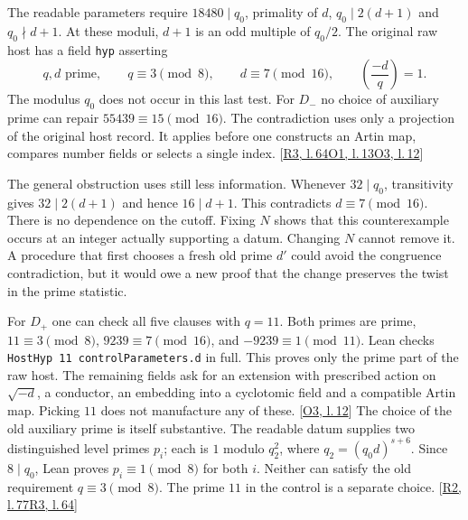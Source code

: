 \documentclass[12pt,letterpaper]{article}
\newcommand{\id}[1]{{\small\nolinkurl{#1}}}
\begin{document}
The readable parameters require $18480\mid q_0$, primality of $d$, $q_0\mid 2(d+1)$ and $q_0\nmid d+1$. At these moduli, $d+1$ is an odd multiple of $q_0/2$. The original raw host has a field \id{hyp} asserting
\[
 q,d\text{ prime},\qquad q\equiv3\pmod8,\qquad
 d\equiv7\pmod{16},\qquad \left(\frac{-d}{q}\right)=1 .
\]
The modulus $q_0$ does not occur in this last test. For $D_-$ no choice of auxiliary prime can repair $55439\equiv15\pmod{16}$. The contradiction uses only a projection of the original host record. It applies before one constructs an Artin map, compares number fields or selects a single index. {\footnotesize\sffamily\color{mute}[\href{https://github.com/leanprover-community/riemann-hypothesis/blob/e063a923620ee7787b4a1270421478645bf66bdb/src/New/Reduction/Data/FieldsAndPlaces.lean#L64}{R3, l.\,64}\enspace \href{https://github.com/nousentllc/riemann-hypothesis/blob/40e56bab026552e089d7afcfeff08d2defb9c005/src/Formalism/FrobeniusOrbits/Statement.lean#L13}{O1, l.\,13}\enspace \href{https://github.com/nousentllc/riemann-hypothesis/blob/40e56bab026552e089d7afcfeff08d2defb9c005/src/Formalism/SharpRestriction/RamificationFrobenius/TotientGaloisClasses/ConjEMemHostFIff.lean#L12}{O3, l.\,12}]}

The general obstruction uses still less information. Whenever $32\mid q_0$, transitivity gives $32\mid 2(d+1)$ and hence $16\mid d+1$. This contradicts $d\equiv7\pmod{16}$. There is no dependence on the cutoff. Fixing $N$ shows that this counterexample occurs at an integer actually supporting a datum. Changing $N$ cannot remove it. A procedure that first chooses a fresh old prime $d'$ could avoid the congruence contradiction, but it would owe a new proof that the change preserves the twist in the prime statistic.

For $D_+$ one can check all five clauses with $q=11$. Both primes are prime, $11\equiv3\pmod8$, $9239\equiv7\pmod{16}$, and $-9239\equiv1\pmod{11}$. Lean checks \id{HostHyp 11 controlParameters.d} in full. This proves only the prime part of the raw host. The remaining fields ask for an extension with prescribed action on $\sqrt{-d}$, a conductor, an embedding into a cyclotomic field and a compatible Artin map. Picking $11$ does not manufacture any of these. {\footnotesize\sffamily\color{mute}[\href{https://github.com/nousentllc/riemann-hypothesis/blob/40e56bab026552e089d7afcfeff08d2defb9c005/src/Formalism/SharpRestriction/RamificationFrobenius/TotientGaloisClasses/ConjEMemHostFIff.lean#L12}{O3, l.\,12}]}
The choice of the old auxiliary prime is itself substantive. The readable datum supplies two distinguished level primes $p_i$; each is $1$ modulo $q_2^2$, where $q_2=(q_0d)^{s+6}$. Since $8\mid q_0$, Lean proves $p_i\equiv1\pmod8$ for both $i$. Neither can satisfy the old requirement $q\equiv3\pmod8$. The prime $11$ in the control is a separate choice. {\footnotesize\sffamily\color{mute}[\href{https://github.com/leanprover-community/riemann-hypothesis/blob/e063a923620ee7787b4a1270421478645bf66bdb/src/New/Reduction/Data/AdmissibleData.lean#L77}{R2, l.\,77}\enspace \href{https://github.com/leanprover-community/riemann-hypothesis/blob/e063a923620ee7787b4a1270421478645bf66bdb/src/New/Reduction/Data/FieldsAndPlaces.lean#L64}{R3, l.\,64}]}
\end{document}
